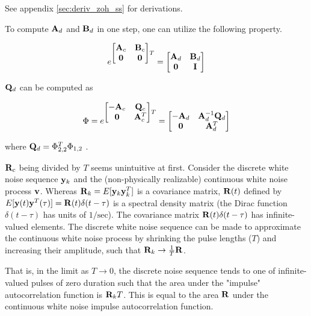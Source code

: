 See appendix \ref{sec:deriv_zoh_ss} for derivations.

To compute $\mathbf{A}_d$ and $\mathbf{B}_d$ in one step, one can utilize the
following property.

\begin{equation*}
  e^{
  \begin{bmatrix}
    \mathbf{A}_c & \mathbf{B}_c \\
    \mathbf{0} & \mathbf{0}
  \end{bmatrix}T} =
  \begin{bmatrix}
    \mathbf{A}_d & \mathbf{B}_d \\
    \mathbf{0} & \mathbf{I}
  \end{bmatrix}
\end{equation*}

$\mathbf{Q}_d$ can be computed as

\begin{equation*}
  \Phi = e^{
  \begin{bmatrix}
    -\mathbf{A}_c & \mathbf{Q}_c \\
    \mathbf{0} & \mathbf{A}_c^T
  \end{bmatrix}T} =
  \begin{bmatrix}
    -\mathbf{A}_d & \mathbf{A}_d^{-1} \mathbf{Q}_d \\
    \mathbf{0} & \mathbf{A}_d^T
  \end{bmatrix}
\end{equation*}

where $\mathbf{Q}_d = \Phi_{2,2}^T \Phi_{1,2}$ \cite{bib:integral_matrix_exp}.

$\mathbf{R}_c$ being divided by $T$ seems unintuitive at first. Consider the
discrete white noise sequence $\mathbf{y}_k$ and the (non-physically realizable)
continuous white noise process $\mathbf{v}$. Whereas
$\mathbf{R}_k = E[\mathbf{y}_k \mathbf{y}_k^T]$ is a covariance matrix, $\mathbf{R}(t)$
defined by $E[\mathbf{y}(t) \mathbf{y}^T(\tau)] = \mathbf{R}(t)\delta(t - \tau)$ is a
spectral density matrix (the Dirac function $\delta(t - \tau)$ has units of
$1/\text{sec}$). The covariance matrix $\mathbf{R}(t)\delta(t - \tau)$ has
infinite-valued elements. The discrete white noise sequence can be made to
approximate the continuous white noise process by shrinking the pulse lengths
($T$) and increasing their amplitude, such that
$\mathbf{R}_k \rightarrow \frac{1}{T}\mathbf{R}$.

That is, in the limit as $T \rightarrow 0$, the discrete noise sequence tends to
one of infinite-valued pulses of zero duration such that the area under the
"impulse" autocorrelation function is $\mathbf{R}_k T$. This is equal to the area
$\mathbf{R}$ under the continuous white noise impulse autocorrelation function.
